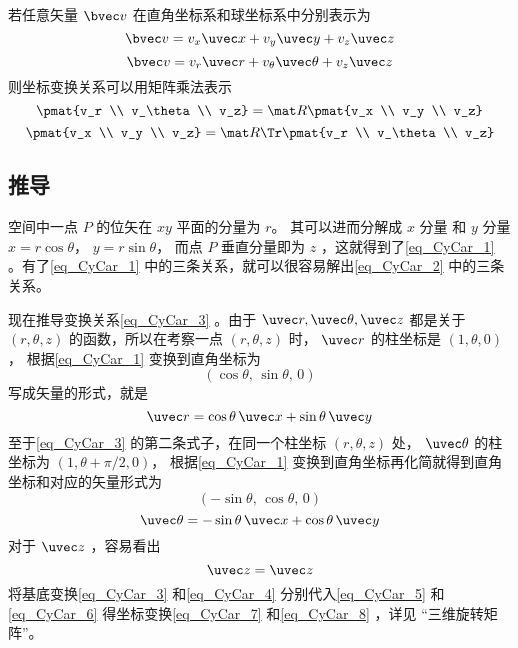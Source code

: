 若任意矢量 $\bvec v$ 在直角坐标系和球坐标系中分别表示为
\begin{equation}\label{eq_CyCar_6}
\bvec v = v_x \uvec x + v_y \uvec y + v_z \uvec z
\end{equation}
\begin{equation}\label{eq_CyCar_5}
\bvec v = v_r \uvec r + v_\theta \uvec \theta + v_z \uvec z
\end{equation}
则坐标变换关系可以用矩阵乘法表示
\begin{equation}\label{eq_CyCar_8}
\pmat{v_r \\ v_\theta \\ v_z}
= \mat R \pmat{v_x \\ v_y \\ v_z}
\end{equation}
\begin{equation}\label{eq_CyCar_7}
\pmat{v_x \\ v_y \\ v_z}
= \mat R\Tr \pmat{v_r \\ v_\theta \\ v_z}
\end{equation}
\subsection{推导}
空间中一点 $P$ 的位矢在 $xy$ 平面的分量为 $r$。 其可以进而分解成 $x$ 分量 和 $y$ 分量  $x = r\cos \theta$，  $y = r\sin \theta$， 而点 $P$ 垂直分量即为 $z$ ，这就得到了\autoref{eq_CyCar_1} 。有了\autoref{eq_CyCar_1} 中的三条关系，就可以很容易解出\autoref{eq_CyCar_2} 中的三条关系。

现在推导变换关系\autoref{eq_CyCar_3} 。由于 $\uvec r,\uvec \theta ,\uvec z $ 都是关于 $(r, \theta, z)$ 的函数，所以在考察一点 $(r, \theta, z)$ 时， $\uvec r$ 的柱坐标是 $(1, \theta, 0)$，  根据\autoref{eq_CyCar_1} 变换到直角坐标为
\begin{equation}
(\cos \theta,\,\sin \theta,\,0)
\end{equation}
写成矢量的形式，就是
 \begin{equation}
\uvec r = \cos \theta \,\uvec x + \sin \theta \,\uvec y 
\end{equation}
至于\autoref{eq_CyCar_3} 的第二条式子，在同一个柱坐标 $(r,\theta ,z)$ 处， $\uvec \theta $ 的柱坐标为 $(1, \theta + \pi /2, 0)$， 根据\autoref{eq_CyCar_1} 变换到直角坐标再化简就得到直角坐标和对应的矢量形式为
\begin{equation}
(-\sin \theta ,\,\cos \theta , \,0)
\end{equation}
\begin{equation}
\uvec \theta  = -\sin \theta  \,\uvec x + \cos \theta \,\uvec y
\end{equation}
对于 $\uvec z$ ，容易看出
\begin{equation}
\uvec z = \uvec z
\end{equation}
将基底变换\autoref{eq_CyCar_3}  和\autoref{eq_CyCar_4} 分别代入\autoref{eq_CyCar_5}  和\autoref{eq_CyCar_6} 得坐标变换\autoref{eq_CyCar_7} 和\autoref{eq_CyCar_8} ，详见 “三维旋转矩阵”。
